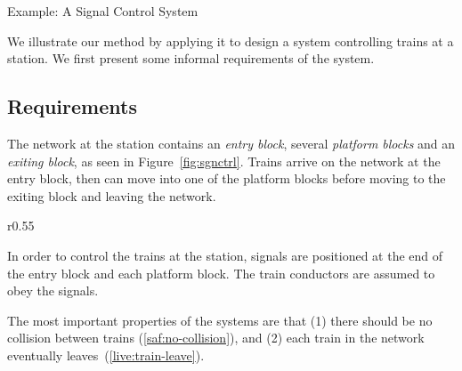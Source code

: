 \newcommand{\PREAMBLE}

\section{Example: A Signal Control System}
\label{sec:example}

We illustrate our method by applying it to design a system controlling
trains at a station.  We first present some informal requirements of
the system.

\subsection{Requirements}
\label{sec:requirements}

The network at the station contains an \emph{entry block}, several
\emph{platform blocks} and an \emph{exiting block}, as seen in
Figure~\ref{fig:sgnctrl}.  Trains arrive on the network at the entry
block, then can move into one of the platform blocks before moving to
the exiting block and leaving the network.
\begin{wrapfigure}{r}{0.55\linewidth}
  \centering 
  \caption{A signal control system}
  \label{fig:sgnctrl}
\end{wrapfigure}
\begin{requirements}
\end{requirements}

In order to control the trains at the station, signals are positioned
at the end of the entry block and each platform block.  The
train conductors are assumed to obey the signals.
\begin{requirements}
  \ReqSpacing
  \ReqSpacing
   \ReqSpacing
\end{requirements}

The most important properties of the systems are that (1) there should be
no collision between trains (\ref{saf:no-collision}), and (2) each train in the network eventually
leaves~(\ref{live:train-leave}).
\begin{requirements}
  \ReqSpacing
\end{requirements}

